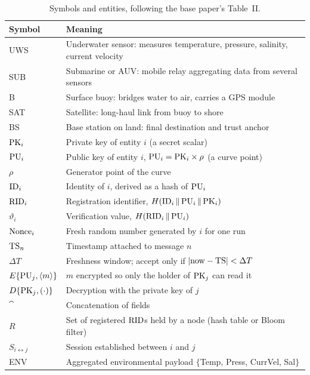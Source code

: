 \begin{table}[H]
\centering
\caption{Symbols and entities, following the base paper's Table~II.}
\label{tab:notation}
\small
\begin{tabularx}{\textwidth}{@{}L{26mm} X@{}}
\toprule
\textbf{Symbol} & \textbf{Meaning}\\
\midrule
UWS  & Underwater sensor: measures temperature, pressure, salinity, current velocity\\
SUB  & Submarine or AUV: mobile relay aggregating data from several sensors\\
B    & Surface buoy: bridges water to air, carries a GPS module\\
SAT  & Satellite: long-haul link from buoy to shore\\
BS   & Base station on land: final destination and trust anchor\\
\midrule
$\mathrm{PK}_i$    & Private key of entity $i$ (a secret scalar)\\
$\mathrm{PU}_i$    & Public key of entity $i$, $\mathrm{PU}_i = \mathrm{PK}_i \times \rho$ (a curve point)\\
$\rho$     & Generator point of the curve\\
$\mathrm{ID}_i$    & Identity of $i$, derived as a hash of $\mathrm{PU}_i$\\
$\mathrm{RID}_i$   & Registration identifier, $H(\mathrm{ID}_i \,\|\, \mathrm{PU}_i \,\|\, \mathrm{PK}_i)$\\
$\vartheta_i$ & Verification value, $H(\mathrm{RID}_i \,\|\, \mathrm{PU}_i)$\\
$\mathrm{Nonce}_i$ & Fresh random number generated by $i$ for one run\\
$\mathrm{TS}_n$    & Timestamp attached to message $n$\\
$\Delta T$ & Freshness window; accept only if $|\mathrm{now} - \mathrm{TS}| < \Delta T$\\
$E\{\mathrm{PU}_j, \langle m\rangle\}$ & $m$ encrypted so only the holder of $\mathrm{PK}_j$ can read it\\
$D\{\mathrm{PK}_j, (\cdot)\}$ & Decryption with the private key of $j$\\
$\cat$     & Concatenation of fields\\
$R$        & Set of registered $\mathrm{RID}$s held by a node (hash table or Bloom filter)\\
$S_{i\leftrightarrow j}$ & Session established between $i$ and $j$\\
ENV        & Aggregated environmental payload $\{$Temp, Press, CurrVel, Sal$\}$\\
\bottomrule
\end{tabularx}
\end{table}
